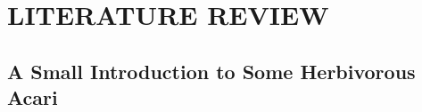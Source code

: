 \documentclass{ufdissertation}[overrideChapters] %
\begin{document}
        \setcounter{secnumdepth}{5}
        \docBodytrue


 \doublespacing
    {\hypertarget{literature-review}{%
\chapter{LITERATURE REVIEW}\label{literature-review}}

\hypertarget{a-small-introduction-to-some-herbivorous-acari}{%
\section{A Small Introduction to Some Herbivorous Acari}\label{a-small-introduction-to-some-herbivorous-acari}}

}
\end{document}
